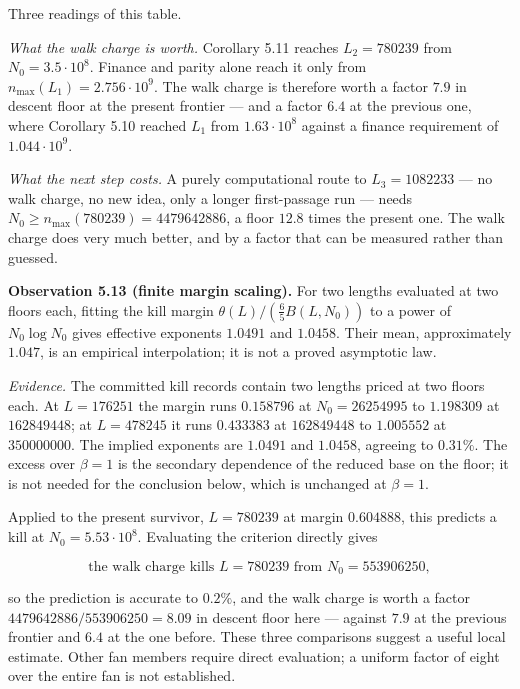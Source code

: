 \documentclass[12pt]{article}
\begin{document}
\endgroup

Three readings of this table.

\emph{What the walk charge is worth.} Corollary 5.11 reaches
\(L_2=780239\) from \(N_0=3.5\cdot10^{8}\). Finance and parity alone
reach it only from \(n_{\max}(L_1)=2.756\cdot10^{9}\). The walk charge
is therefore worth a factor \(7.9\) in descent floor at the present
frontier --- and a factor \(6.4\) at the previous one, where Corollary
5.10 reached \(L_1\) from \(1.63\cdot10^{8}\) against a finance
requirement of \(1.044\cdot10^{9}\).

\emph{What the next step costs.} A purely computational route to
\(L_3=1082233\) --- no walk charge, no new idea, only a longer
first-passage run --- needs \(N_0\ge n_{\max}(780239)=4479642886\), a
floor \(12.8\) times the present one. The walk charge does very much
better, and by a factor that can be measured rather than guessed.

\textbf{Observation 5.13 (finite margin scaling).} For two lengths
evaluated at two floors each, fitting the kill margin
\(\theta(L)/(\tfrac65B(L,N_0))\) to a power of \(N_0\log N_0\) gives
effective exponents \(1.0491\) and \(1.0458\). Their mean, approximately
\(1.047\), is an empirical interpolation; it is not a proved asymptotic
law.

\emph{Evidence.} The committed kill records contain two lengths priced
at two floors each. At \(L=176251\) the margin runs \(0.158796\) at
\(N_0=26254995\) to \(1.198309\) at \(162849448\); at \(L=478245\) it
runs \(0.433383\) at \(162849448\) to \(1.005552\) at \(350000000\). The
implied exponents are \(1.0491\) and \(1.0458\), agreeing to \(0.31\%\).
The excess over \(\beta=1\) is the secondary dependence of the reduced
base on the floor; it is not needed for the conclusion below, which is
unchanged at \(\beta=1\).

Applied to the present survivor, \(L=780239\) at margin \(0.604888\),
this predicts a kill at \(N_0=5.53\cdot10^{8}\). Evaluating the
criterion directly gives

\[
\text{the walk charge kills } L=780239 \text{ from } N_0=553906250,
\]

so the prediction is accurate to \(0.2\%\), and the walk charge is worth
a factor \(4479642886/553906250=8.09\) in descent floor here --- against
\(7.9\) at the previous frontier and \(6.4\) at the one before. These
three comparisons suggest a useful local estimate. Other fan members
require direct evaluation; a uniform factor of eight over the entire fan
is not established.
\end{document}
